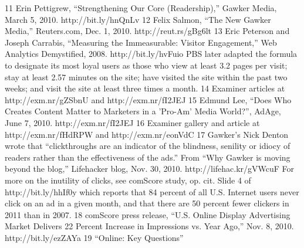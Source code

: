 11 Erin Pettigrew, ``Strengthening Our Core (Readership),'' Gawker Media, March 5, 2010.
http://bit.ly/hnQnLv
12 Felix Salmon, ``The New Gawker Media,'' Reuters.com, Dec. 1, 2010. http://reut.rs/gBg6lt
13 Eric Peterson and Joseph Carrabis, ``Measuring the Immeasurable: Visitor Engagement,''
Web Analytics Demystified, 2008. http://bit.ly/hvFuio PBS later adapted the formula to
designate its most loyal users as those who view at least 3.2 pages per visit; stay at least 2.57
minutes on the site; have visited the site within the past two weeks; and visit the site at least
three times a month.
14 Examiner articles at http://exm.nr/gZSbnU and http://exm.nr/fI2JEJ
15 Edmund Lee, ``Does Who Creates Content Matter to Marketers in a 'Pro-Am' Media World?'',
AdAge, June 7, 2010. http://exm.nr/fI2JEJ
16 Examiner gallery and article at http://exm.nr/fHdRPW and http://exm.nr/eonVdC
17 Gawker's Nick Denton wrote that ``clickthroughs are an indicator of the blindness, senility
or idiocy of readers rather than the effectiveness of the ads.'' From ``Why Gawker is moving
beyond the blog,'' Lifehacker blog, Nov. 30, 2010. http://lifehac.kr/gVWcuF For more on the
inutility of clicks, see comScore study, op. cit. Slide 4 of http://bit.ly/hhIf0y which reports that
84 percent of all U.S. Internet users never click on an ad in a given month, and that there are
50 percent fewer clickers in 2011 than in 2007.
18 comScore press release, ``U.S. Online Display Advertising Market Delivers 22 Percent Increase
in Impressions vs. Year Ago,'' Nov. 8, 2010. http://bit.ly/ezZAYa
19 ``Online: Key Questions''


